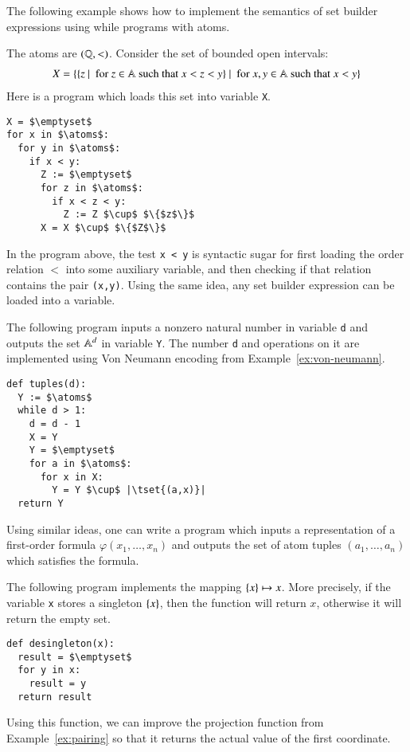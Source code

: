  The following example shows how  to implement the semantics of set builder expressions using  while programs with atoms.

 \begin{myexample}\label{ex:while-constructes-hdef}
	The atoms are  $(\mathbb Q, <)$.  Consider the set  of bounded open intervals:
	\begin{align*}
	X = \{\{z\ |\ \text{ for }z \in \mathbb A \text{ such that }x < z < y\}\ |\ \text{ for }x,y \in \mathbb A \text{ such that }x<y\}
	\end{align*}
	  Here is a program which loads this set into variable \texttt{X}.  
	  \begin{lstlisting}
X = $\emptyset$
for x in $\atoms$:
  for y in $\atoms$:
    if x < y:
      Z := $\emptyset$
      for z in $\atoms$:
        if x < z < y:
          Z := Z $\cup$ $\{$z$\}$
      X = X $\cup$ $\{$Z$\}$
			   \end{lstlisting}
	  In the program above, the test  \texttt{x < y} is syntactic sugar for first loading the order relation $<$ into some auxiliary variable, and then checking if that relation contains the pair  {\tt(x,y)}.	  Using the same idea, any set builder expression can be loaded into a variable. 
\end{myexample}


\begin{myexample}\label{ex:uniform-fo-formulas}
 The following program inputs a nonzero natural number in variable \texttt{d} and outputs the set $\mathbb A^d$ in variable \texttt{Y}. The number \texttt{d} and operations on it are implemented using Von Neumann encoding from Example~\ref{ex:von-neumann}.
	\begin{lstlisting}
def tuples(d):
  Y := $\atoms$
  while d > 1:
    d = d - 1
    X = Y
    Y = $\emptyset$
    for a in $\atoms$:
      for x in X:
        Y = Y $\cup$ |\tset{(a,x)}|
  return Y
 \end{lstlisting}
 Using similar ideas, one can write a program which inputs a representation of a first-order formula $\varphi(x_1,\ldots,x_n)$ and outputs the set of atom tuples $(a_1,\ldots,a_n)$ which satisfies the formula.
\end{myexample}


\begin{myexample}[Desingleton]\label{ex:desingleton}
The following program  implements the mapping $\{x\} \mapsto x$. More precisely, if the variable \texttt{x} stores a singleton $\{x\}$, then the function will return $x$, otherwise it  will return  the empty set.
\begin{lstlisting}
def desingleton(x):
  result = $\emptyset$
  for y in x:
    result = y
  return result
\end{lstlisting}
Using this function, we can improve the projection function from Example~\ref{ex:pairing} so that it returns the actual value of the first coordinate. 
\end{myexample}











